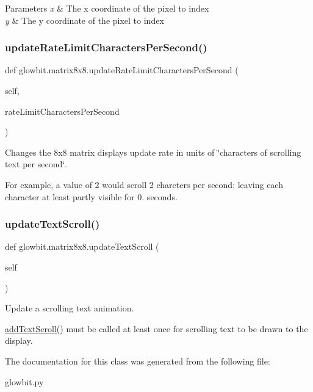 \begin{DoxyParams}{Parameters}
{\em x} & The x coordinate of the pixel to index \\
\hline
{\em y} & The y coordinate of the pixel to index \\
\hline
\end{DoxyParams}
\mbox{\label{classglowbit_1_1matrix8x8_a5dfbe10ccf2acca4d6d4012e29e7b439}} 
\subsubsection{\texorpdfstring{update\+Rate\+Limit\+Characters\+Per\+Second()}{updateRateLimitCharactersPerSecond()}}
{\footnotesize\ttfamily def glowbit.\+matrix8x8.\+update\+Rate\+Limit\+Characters\+Per\+Second (\begin{DoxyParamCaption}\item[{}]{self,  }\item[{}]{rate\+Limit\+Characters\+Per\+Second }\end{DoxyParamCaption})}



Changes the 8x8 matrix display\textquotesingle{}s update rate in units of \char`\"{}characters of scrolling text per second\char`\"{}. 

For example, a value of 2 would scroll 2 charcters per second; leaving each character at least partly visible for 0. seconds. \mbox{\label{classglowbit_1_1matrix8x8_a4a529f9b42ea95cc0f5dafcb0085d096}} 
\subsubsection{\texorpdfstring{update\+Text\+Scroll()}{updateTextScroll()}}
{\footnotesize\ttfamily def glowbit.\+matrix8x8.\+update\+Text\+Scroll (\begin{DoxyParamCaption}\item[{}]{self }\end{DoxyParamCaption})}



Update a scrolling text animation. 

\hyperlink{classglowbit_1_1matrix8x8_ade5b8578e6c38d86f356cdb6997cc314}{add\+Text\+Scroll()} must be called at least once for scrolling text to be drawn to the display. 

The documentation for this class was generated from the following file\+:\begin{DoxyCompactItemize}
\item 
glowbit.\+py\end{DoxyCompactItemize}

